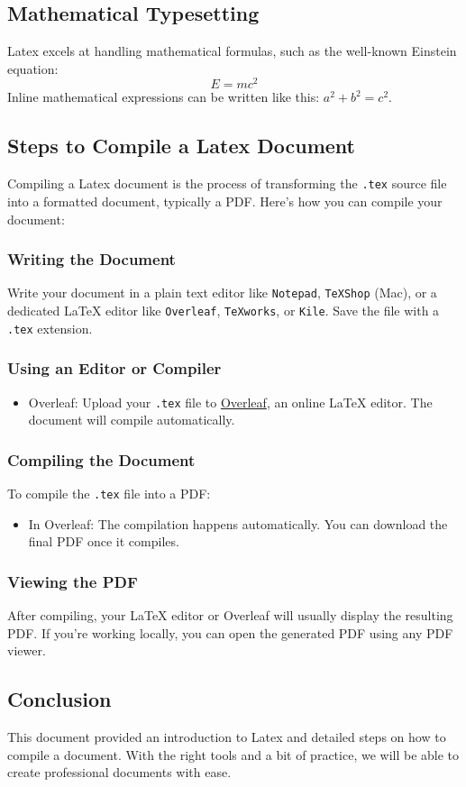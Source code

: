 \subsection{Mathematical Typesetting}
Latex{} excels at handling mathematical formulas, such as the well-known Einstein equation:
\begin{equation}
    E = mc^2
\end{equation}
Inline mathematical expressions can be written like this: \( a^2 + b^2 = c^2 \).

\subsection{Steps to Compile a Latex{} Document}
Compiling a Latex{} document is the process of transforming the \texttt{.tex} source file into a formatted document, typically a PDF. Here's how you can compile your document:

\subsubsection{Writing the Document}
Write your document in a plain text editor like \texttt{Notepad}, \texttt{TeXShop} (Mac), or a dedicated LaTeX editor like \texttt{Overleaf}, \texttt{TeXworks}, or \texttt{Kile}. Save the file with a \texttt{.tex} extension.

\subsubsection{Using an Editor or Compiler}
\begin{itemize}
    \item Overleaf: Upload your \texttt{.tex} file to \href{https://www.overleaf.com}{Overleaf}, an online LaTeX editor. The document will compile automatically.
\end{itemize}

\subsubsection{Compiling the Document}
To compile the \texttt{.tex} file into a PDF:
\begin{itemize}
    \item In Overleaf: The compilation happens automatically. You can download the final PDF once it compiles.
\end{itemize}

\subsubsection{Viewing the PDF}
After compiling, your LaTeX editor or Overleaf will usually display the resulting PDF. If you're working locally, you can open the generated PDF using any PDF viewer.

\subsection{Conclusion}
This document provided an introduction to Latex and detailed steps on how to compile a document. With the right tools and a bit of practice, we will be able to create professional documents with ease.
